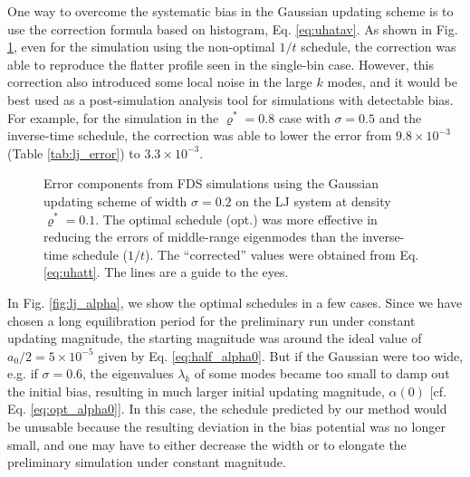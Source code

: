\documentclass[reprint, superscriptaddress, floatfix]{revtex4-1}
\begin{document}
One way to overcome the systematic bias
in the Gaussian updating scheme
is to use the correction formula
based on histogram, Eq. \eqref{eq:uhatav}.
%
As shown in Fig. \ref{fig:lj_xerr},
even for the simulation using the non-optimal $1/t$ schedule,
the correction was able to reproduce
the flatter profile seen in the single-bin case.
%
However, this correction also introduced
some local noise in the large $k$ modes,
and it would be best used as a post-simulation
analysis tool for simulations with detectable bias.
%
For example, for the simulation in the $\varrho^* = 0.8$ case
with $\sigma = 0.5$ and the inverse-time schedule,
the correction was able to lower
the error from $9.8\times10^{-3}$
(Table \ref{tab:lj_error}) to $3.3\times10^{-3}$.


\begin{figure}[h]
\begin{center}
  \caption{
    \label{fig:lj_xerr}
    Error components from FDS simulations
    using the Gaussian updating scheme
    of width $\sigma = 0.2$
    on the LJ system at density $\varrho^* = 0.1$.
    The optimal schedule (opt.) was more effective
    in reducing the errors of middle-range eigenmodes
    than the inverse-time schedule ($1/t$).
    The ``corrected'' values were obtained from
    Eq. \eqref{eq:uhatt}.
    The lines are a guide to the eyes.
  }
\end{center}
\end{figure}

In Fig. \ref{fig:lj_alpha},
we show the optimal schedules in a few cases.
%
%
Since we have chosen a long equilibration period
for the preliminary run under constant updating magnitude,
the starting magnitude was around
the ideal value of $a_0/2 = 5\times10^{-5}$
given by Eq. \eqref{eq:half_alpha0}.
%
But if the Gaussian were too wide,
e.g. if $\sigma = 0.6$,
the eigenvalues $\lambda_k$ of some modes
became too small to damp out the initial bias,
resulting in much larger initial updating magnitude, $\alpha(0)$
[cf. Eq. \eqref{eq:opt_alpha0}].
%
In this case, the schedule predicted by our method
would be unusable because the resulting deviation in the bias potential
was no longer small,
and one may have to either decrease the width
or to elongate the preliminary simulation under constant magnitude.
\end{document}
